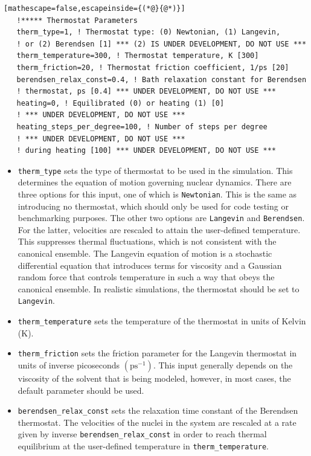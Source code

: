 \documentclass[letterpaper,12pt,titlepage]{article}
\begin{document}
\begin{lstlisting}[mathescape=false,escapeinside={(*@}{@*)}]
   !***** Thermostat Parameters
   therm_type=1, ! Thermostat type: (0) Newtonian, (1) Langevin, 
   ! or (2) Berendsen [1] *** (2) IS UNDER DEVELOPMENT, DO NOT USE ***
   therm_temperature=300, ! Thermostat temperature, K [300]
   therm_friction=20, ! Thermostat friction coefficient, 1/ps [20]
   berendsen_relax_const=0.4, ! Bath relaxation constant for Berendsen 
   ! thermostat, ps [0.4] *** UNDER DEVELOPMENT, DO NOT USE ***
   heating=0, ! Equilibrated (0) or heating (1) [0]
   ! *** UNDER DEVELOPMENT, DO NOT USE ***
   heating_steps_per_degree=100, ! Number of steps per degree 
   ! *** UNDER DEVELOPMENT, DO NOT USE ***
   ! during heating [100] *** UNDER DEVELOPMENT, DO NOT USE ***
\end{lstlisting}
\begin{itemize}
\item \verb+therm_type+ sets the type of thermostat to be used in the simulation.  This determines the equation of motion governing nuclear dynamics.  There are three options for this input, one of which is \verb+Newtonian+.  This is the same as introducing no thermostat, which should only be used for code testing or benchmarking purposes.  The other two options are \verb+Langevin+ and \verb+Berendsen+.  For the latter, velocities are rescaled to attain the user-defined temperature.  This suppresses thermal fluctuations, which is not consistent with the canonical ensemble.  The Langevin equation of motion is a stochastic differential equation that introduces terms for viscosity and a Gaussian random force that controls temperature in such a way that obeys the canonical ensemble.  In realistic simulations, the thermostat should be set to \verb+Langevin+.
\item \verb+therm_temperature+ sets the temperature of the thermostat in units of Kelvin (K).
\item \verb+therm_friction+ sets the friction parameter for the Langevin thermostat in units of inverse picoseconds $\left(\text{ps}^{-1}\right)$.  This input generally depends on the viscosity of the solvent that is being modeled, however, in most cases, the default parameter should be used.
\item \verb+berendsen_relax_const+ sets the relaxation time constant of the Berendsen thermostat.  The velocities of the nuclei in the system are rescaled at a rate given by inverse \verb+berendsen_relax_const+ in order to reach thermal equilibrium at the user-defined temperature in \verb+therm_temperature+.
\end{itemize}
\end{document}
